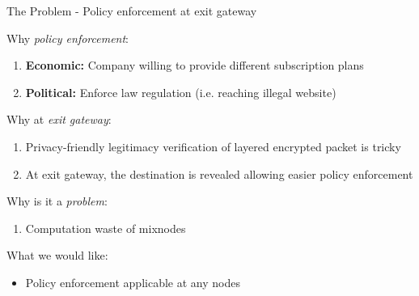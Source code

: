 \begin{frame}{The Problem - Policy enforcement at exit gateway} %

    Why \emph{policy enforcement}:
    \begin{enumerate}
        \item \textbf{Economic:} Company willing to provide different subscription plans
        \item \textbf{Political:} Enforce law regulation (i.e. reaching illegal website)
    \end{enumerate}

    \vfill

    Why at \emph{exit gateway}:
    \begin{enumerate}
        \item Privacy-friendly legitimacy verification of layered encrypted packet is tricky
        \item At exit gateway, the destination is revealed allowing easier policy enforcement
    \end{enumerate}
    
    \vfill

    Why is it a \emph{problem}:
    \begin{enumerate}
        \item Computation waste of mixnodes
    \end{enumerate}
    
    \vfill

    What we would like:
    \begin{itemize}
        \item Policy enforcement applicable at any nodes
    \end{itemize}
\end{frame}